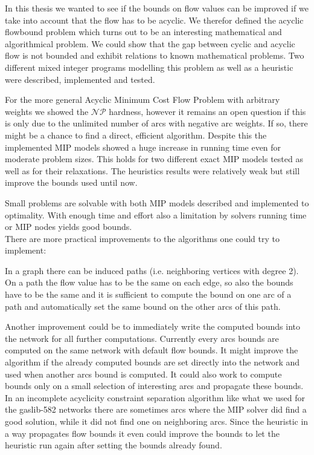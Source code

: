 
In this thesis we wanted to see if the bounds on flow values can be improved if we take into account that the flow has 
to be acyclic. 
We therefor defined the acyclic flowbound problem which turns out to be an interesting mathematical and algorithmical 
problem. We could show that the gap between cyclic and acyclic flow is not bounded and exhibit relations to known 
mathematical problems. Two different mixed integer programs modelling this problem as well as a heuristic were 
described, implemented and tested. 

For the more general Acyclic Minimum Cost Flow Problem with arbitrary weights we showed the $\mathcal{NP}$ hardness, 
however it remains an open question if this is only due to the unlimited number of arcs with negative arc weights. If 
so, there 
might be a chance to find a direct, efficient algorithm.
Despite this the implemented MIP models showed a huge increase in running time even for moderate problem sizes. This 
holds for two different exact MIP models tested as well as for their relaxations. The heuristics results were 
relatively weak but still improve the bounds used until now.

Small problems are solvable with both MIP models described and implemented to optimality. With 
enough time and effort also a limitation by solvers running time or MIP nodes yields good bounds. \\


There are more practical improvements to the algorithms one could try to implement: 

In a graph there can be induced paths (i.e. neighboring vertices with degree 2).
On a path the flow value has to be the same on each edge, so also the bounds have to be the same and it is sufficient 
to compute the bound on one arc of a path and automatically set the same bound on the other arcs of this path.

Another improvement could be to immediately write the computed bounds into the network for all further computations. 
Currently every arcs bounds are computed on the same network with default flow bounds. It might improve the algorithm 
if the already computed bounds are set directly into the network and used when another arcs bound is computed. It could 
also work to compute bounds only on a small selection of interesting arcs and propagate these bounds. In an incomplete 
acyclicity constraint separation algorithm like what we used for the gaslib-582 networks there are sometimes arcs where 
the MIP solver did find a good solution, while it did not find one on neighboring arcs. Since the heuristic in a way 
propagates flow bounds it even could improve the bounds to let the heuristic run again after setting the bounds already 
found.

